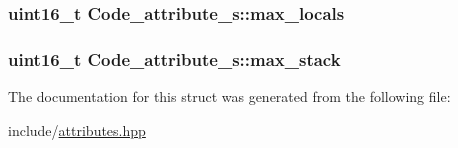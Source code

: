 \hypertarget{structCode__attribute__s_a1c9257d634d9e8473acf1a3d13fac4e7}{
\subsubsection[{max\+\_\+locals}]{\setlength{\rightskip}{0pt plus 5cm}uint16\+\_\+t Code\+\_\+attribute\+\_\+s\+::max\+\_\+locals}}\label{structCode__attribute__s_a1c9257d634d9e8473acf1a3d13fac4e7}
\hypertarget{structCode__attribute__s_a9f7cd4c713b350f6630949c6364e8e48}{
\subsubsection[{max\+\_\+stack}]{\setlength{\rightskip}{0pt plus 5cm}uint16\+\_\+t Code\+\_\+attribute\+\_\+s\+::max\+\_\+stack}}\label{structCode__attribute__s_a9f7cd4c713b350f6630949c6364e8e48}


The documentation for this struct was generated from the following file\+:\begin{DoxyCompactItemize}
\item 
include/\hyperlink{attributes_8hpp}{attributes.\+hpp}\end{DoxyCompactItemize}
